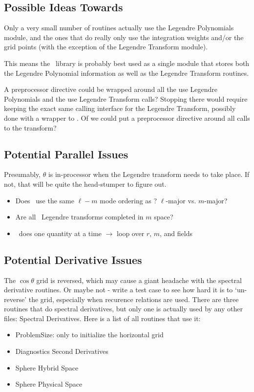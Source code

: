 \documentclass[10pt,letterpaper]{article}
\begin{document}
\subsection{Possible Ideas Towards \shtns}
Only a very small number of routines actually use the Legendre Polynomials module,
and the ones that do really only use the integration weights and/or the grid points
(with the exception of the Legendre Transform module).

This means the \shtns\ library is probably best used as a single module that stores
both the Legendre Polynomial information as well as the Legendre Transform routines.

A preprocessor directive could be wrapped around all the use Legendre Polynomials and
the use Legendre Transform calls? Stopping there would require keeping the exact same
calling interface for the Legendre Transform, possibly done with a wrapper to \shtns.
Of we could put a preprocessor directive around all calls to the transform?

\subsection{Potential Parallel Issues}
Presumably, $\theta$ is in-processor when the Legendre transform needs to take place. If
not, that will be quite the head-stumper to figure out.
\begin{itemize}
  \item Does \rayleigh\ use the same $\ell-m$ mode ordering as \shtns?
        $\ell$-major vs. $m$-major?
  \item Are all \rayleigh\ Legendre transforms completed in $m$ space?
  \item \shtns\ does one quantity at a time $\rightarrow$ loop over $r$, $m$, and fields
\end{itemize}

\subsection{Potential Derivative Issues}
The $\cos\theta$ grid is reversed, which may cause a giant headache with the spectral
derivative routines. Or maybe not - write a test case to see how hard it is to
`un-reverse' the grid, especially when recurence relations are used. There are three
routines that do spectral derivatives, but only one is actually used by any other
files: Spectral Derivatives. Here is a list of all routines that use it:
\begin{itemize}
  \item ProblemSize: only to initialize the horizontal grid
  \item Diagnostics Second Derivatives
  \item Sphere Hybrid Space
  \item Sphere Physical Space
\end{itemize}
\end{document}
